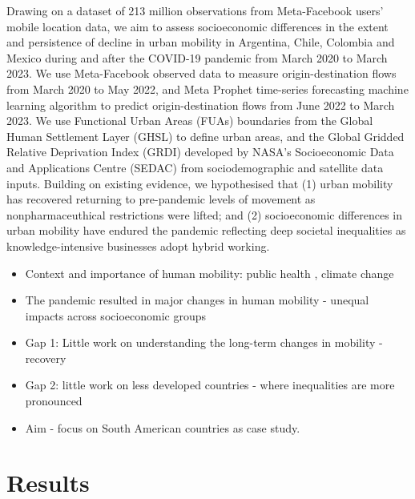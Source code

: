\documentclass[
  11pt,
]{article}
\providecommand{\tightlist}{%
  \setlength{\itemsep}{0pt}\setlength{\parskip}{0pt}}\usepackage{longtable,booktabs,array}
\begin{document}
Drawing on a dataset of 213 million observations from Meta-Facebook
users' mobile location data, we aim to assess socioeconomic differences
in the extent and persistence of decline in urban mobility in Argentina,
Chile, Colombia and Mexico during and after the COVID-19 pandemic from
March 2020 to March 2023. We use Meta-Facebook observed data to measure
origin-destination flows from March 2020 to May 2022, and Meta Prophet
time-series forecasting machine learning algorithm to predict
origin-destination flows from June 2022 to March 2023. We use Functional
Urban Areas (FUAs) boundaries from the Global Human Settlement Layer
(GHSL) to define urban areas, and the Global Gridded Relative
Deprivation Index (GRDI) developed by NASA's Socioeconomic Data and
Applications Centre (SEDAC) from sociodemographic and satellite data
inputs. Building on existing evidence, we hypothesised that (1) urban
mobility has recovered returning to pre-pandemic levels of movement as
nonpharmaceuthical restrictions were lifted; and (2) socioeconomic
differences in urban mobility have endured the pandemic reflecting deep
societal inequalities as knowledge-intensive businesses adopt hybrid
working.

\begin{itemize}
\tightlist
\item
  Context and importance of human mobility: public health , climate
  change\\
\item
  The pandemic resulted in major changes in human mobility - unequal
  impacts across socioeconomic groups\\
\item
  Gap 1: Little work on understanding the long-term changes in mobility
  - recovery\\
\item
  Gap 2: little work on less developed countries - where inequalities
  are more pronounced\\
\item
  Aim - focus on South American countries as case study.
\end{itemize}

\hypertarget{sec-results}{%
\section{Results}\label{sec-results}}
\end{document}
